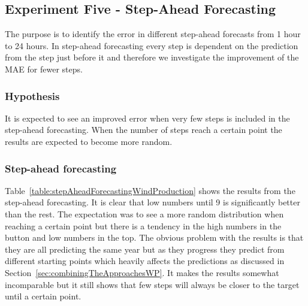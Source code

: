 \newpage

\subsection{Experiment Five - Step-Ahead Forecasting}
\label{sec:windPowerExperimentFive}
The purpose is to identify the error in different step-ahead forecasts from 1 hour to 24 hours. In step-ahead forecasting every step is dependent on the prediction from the step just before it and therefore we investigate the improvement of the MAE for fewer steps.

\subsubsection{Hypothesis}
It is expected to see an improved error when very few steps is included in the step-ahead forecasting. When the number of steps reach a certain point the results are expected to become more random.

\subsubsection{Step-ahead forecasting}
Table~\ref{table:stepAheadForecastingWindProduction} shows the results from the step-ahead forecasting. It is clear that low numbers until 9 is significantly better than the rest. The expectation was to see a more random distribution when reaching a certain point but there is a tendency in the high numbers in the button and low numbers in the top. The obvious problem with the results is that they are all predicting the same year but as they progress they predict from different starting points which heavily affects the predictions as discussed in Section~\ref{sec:combiningTheApproachesWP}. It makes the results somewhat incomparable but it still shows that few steps will always be closer to the target until a certain point.

